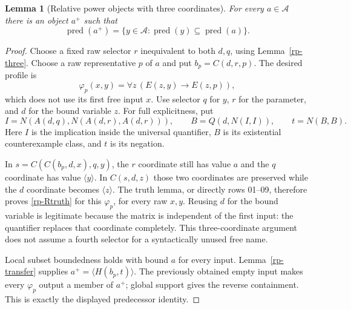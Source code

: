 \documentclass[11pt]{article}
\newtheorem{lemma}[theorem]{Lemma}
\newcommand{\cl}[1]{\langle#1\rangle}
\begin{document}
\begin{lemma}[Relative power objects with three coordinates]\label{rp-power}
For every $a\in\mathcal A$ there is an object $a^+$ such that
\[
 \operatorname{pred}(a^+)
   =\{y\in\mathcal A:\operatorname{pred}(y)
                         \subseteq\operatorname{pred}(a)\}.
\]
\end{lemma}
\begin{proof}
Choose a fixed raw selector $r$ inequivalent to both $d,q$, using
Lemma~\ref{rp-three}. Choose a raw representative $p$ of $a$ and put
$b_p=C(d,r,p)$. The desired profile is
\[
 \varphi_p(x,y)=\forall z\,(E(z,y)\longrightarrow E(z,p)),
\]
which does not use its first free input $x$. Use selector $q$ for $y$,
$r$ for the parameter, and $d$ for the bound variable $z$.
For full explicitness, put
\[
 I=N(A(d,q),N(A(d,r),A(d,r))),\qquad
 B=Q(d,N(I,I)),\qquad t=N(B,B).
\]
Here $I$ is the implication inside the universal quantifier, $B$ is
its existential counterexample class, and $t$ is its negation.

In $s=C(C(b_p,d,x),q,y)$, the $r$ coordinate still has value $a$
and the $q$ coordinate has value $\cl y$. In $C(s,d,z)$ those two
coordinates are preserved while the $d$ coordinate becomes $\cl z$.
The truth lemma, or directly rows 01--09, therefore proves
\eqref{rp-Rtruth} for this $\varphi_p$, for every raw $x,y$.
Reusing $d$ for the bound variable is legitimate because the matrix
is independent of the first input: the quantifier replaces that
coordinate completely. This three-coordinate argument does not assume
a fourth selector for a syntactically unused free name.

Local subset boundedness holds with bound $a$ for every input.
Lemma~\ref{rp-transfer} supplies $a^+=\cl{H(b_p,t)}$. The previously
obtained empty input makes every $\varphi_p$ output a member of
$a^+$; global support gives the reverse containment. This is exactly
the displayed predecessor identity.
\end{proof}
\end{document}
